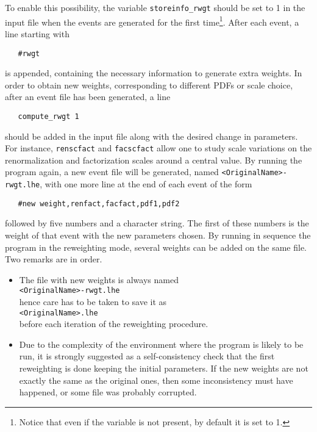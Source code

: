 To enable this possibility, the variable \texttt{storeinfo\_rwgt} should be set 
to 1 in the \powheg input file when the events are generated for the 
first time\footnote{Notice that even if the variable is not present, by 
default it is set to 1.}. After each event, a line starting with 
\begin{verbatim}
   #rwgt 
\end{verbatim}
is appended, containing the necessary information to generate extra 
weights. In order to obtain new weights, corresponding to different 
PDFs or scale choice, after an event file has been generated, a line 
\begin{verbatim}
   compute_rwgt 1 
\end{verbatim}
should be added in the input file along with the desired change in parameters. For instance, \texttt{renscfact} and
\texttt{facscfact} allow one to study scale variations on the
renormalization and factorization scales around a central value. By
running the program again, a new event file will be generated, named
\texttt{<OriginalName>-rwgt.lhe}, with one more line at the end of each event of the form
\begin{verbatim}
   #new weight,renfact,facfact,pdf1,pdf2 
\end{verbatim}
followed by five numbers and a character string. The first of these 
numbers is the weight of that event with the new parameters chosen. By 
running in sequence the program in the reweighting mode, several 
weights can be added on the same file. Two remarks are in order.

\begin{itemize} 

\item The file with new weights is always named \\
\texttt{<OriginalName>-rwgt.lhe}\\
hence care has to be taken to save it as \\
\texttt{<OriginalName>.lhe}\\
before each iteration of the reweighting procedure. 

\item Due to the complexity of the environment where the program is 
likely to be run, it is strongly suggested as a self-consistency check 
that the first reweighting is done keeping the initial parameters. If 
the new weights are not exactly the same as the original ones, then 
some inconsistency must have happened, or some file was probably 
corrupted. 

\end{itemize} 

